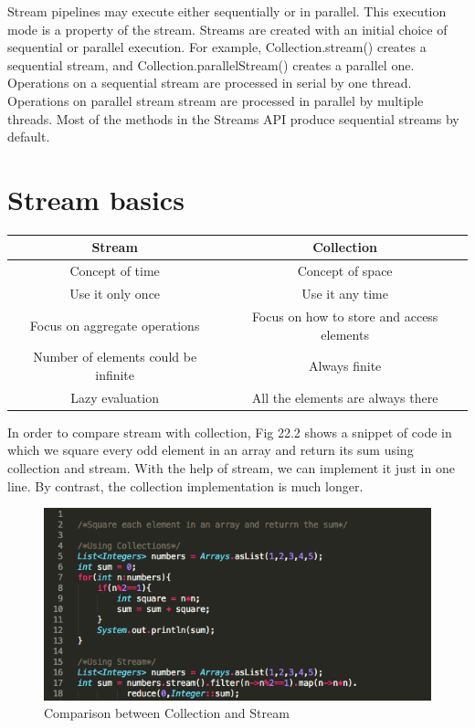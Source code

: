 \documentclass[twoside]{article}
\begin{document}
Stream pipelines may execute either sequentially or in parallel. This execution mode is a property of the stream. Streams are created with an initial choice of sequential or parallel execution. For example, Collection.stream() creates a sequential stream, and Collection.parallelStream() creates a parallel one. Operations on a sequential stream are processed in serial by one thread. Operations on parallel stream stream are processed in parallel by multiple threads.
Most of the methods in the Streams API produce sequential streams by default. 

\section{Stream basics}

\begin{center}
\begin{tabular}{ |c|c| } 
 \hline
 Stream & Collection  \\
 \hline
 Concept of time & Concept of space  \\ 
 Use it only once & Use it any time  \\ 
 Focus on aggregate operations & Focus on how to store and access elements \\ 
 Number of elements could be infinite & Always finite  \\ 
 Lazy evaluation & All the elements are always there  \\ 
 \hline
\end{tabular}
\end{center}

In order to compare stream with collection, Fig 22.2 shows a snippet of code in which we square every odd element in an array and return its sum using collection and stream. With the help of stream, we can implement it just in one line. By contrast, the collection implementation is much longer.
 
\begin{figure}[h]
\centering
\includegraphics[scale=0.8]{Fig1}
\caption{Comparison between Collection and Stream }
\label{fig:1}
\end{figure}
\end{document}
